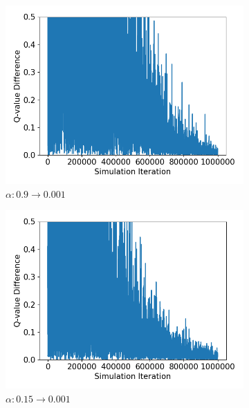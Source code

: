 \documentclass[10pt]{article}
\begin{document}
\begin{figure}[H]
  \centering
  \begin{subfigure}[b]{0.245\linewidth}
  \centering
  \includegraphics[width=\linewidth]{../figs/Q_offpolicy_09_1_1000000_replot.png}
      \caption{$\alpha:0.9\rightarrow0.001$}
  \label{fig:Q09_y_cut}
  \end{subfigure}
  \begin{subfigure}[b]{0.245\linewidth}
  \centering
  \includegraphics[width=\linewidth]{../figs/Q_offpolicy_015_0001_1_0001_1000000.png}
      \caption{$\alpha:0.15\rightarrow0.001$}
  \label{fig:Q015_y_cut}
  \end{subfigure}
  \begin{subfigure}[b]{0.245\linewidth}

\end{subfigure}
\end{figure}
\end{document}
